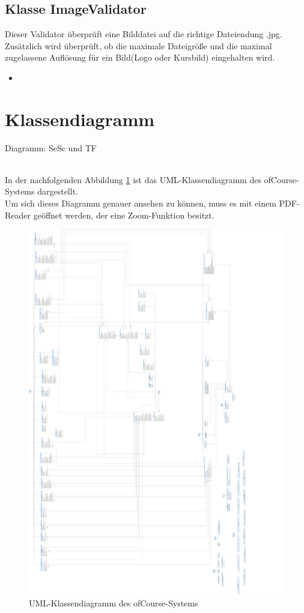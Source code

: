 	\subsection{Klasse ImageValidator}
	Dieser Validator überprüft eine Bilddatei auf die richtige Dateiendung .jpg. Zusätzlich wird überprüft, ob
	die maximale Dateigröße und die maximal zugelassene Auflösung für ein Bild(Logo oder Kursbild) eingehalten wird.
	\begin{itemize}
		\item \override
	\end{itemize}
	
	\section{Klassendiagramm}
	\begin{tiny}
		Diagramm: SeSc und TF\\
	\end{tiny}\\
	In der nachfolgenden Abbildung \ref{fig:classdiag} ist das UML-Klassendiagramm des ofCourse-Systems dargestellt.\\
	Um sich dieses Diagramm genauer ansehen zu können, muss es mit einem PDF-Reader
	geöffnet werden, der eine Zoom-Funktion besitzt.
	
	\begin{figure}[h]
		\centering
		\includegraphics[width=1\linewidth]{Grafiken/Klassendiagramm}
		\caption{UML-Klassendiagramm des ofCourse-Systems}
		\label{fig:classdiag}
	\end{figure}
	

